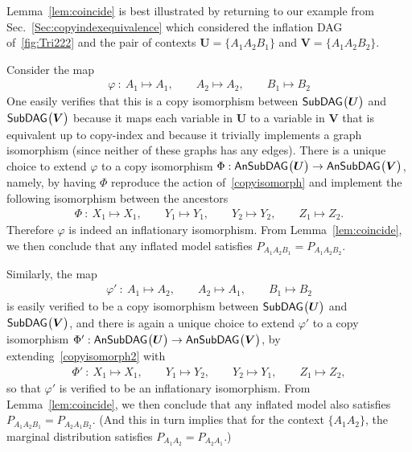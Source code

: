 {Lemma~\ref{lem:coincide} is best illustrated by returning to our example from Sec.~\ref{Sec:copyindexequivalence} 
which considered the inflation DAG of~\cref{fig:Tri222} and the pair of contexts $\bm{U} = \{ A_1 A_2 B_1\}$ and $\bm{V} =\{ A_1 A_2 B_2\}$.  

Consider the map 
\begin{align}\label{copyisomorph}
	\varphi \: : \: A_1 \mapsto A_1,\qquad A_2\mapsto A_2,\qquad B_1\mapsto B_2
\end{align}
One easily verifies that this is a copy isomorphism between ${\operatorname{\mathsf{SubDAG}}_{}}\bigl\lparen\bm{U}\bigr\rparen$ and ${\operatorname{\mathsf{SubDAG}}_{}}\bigl\lparen\bm{V}\bigr\rparen$
because it maps each variable in $\bm{U}$ to a variable in $\bm{V}$ that is equivalent up to copy-index  and because it trivially implements a graph isomorphism (since neither of these graphs has any edges). There is a unique choice to extend $\varphi$ to a copy isomorphism $\Phi:{\operatorname{\mathsf{AnSubDAG}}_{}}\bigl\lparen\bm{U}\bigr\rparen\to{\operatorname{\mathsf{AnSubDAG}}_{}}\bigl\lparen\bm{V}\bigr\rparen$, namely, by having $\Phi$ reproduce the action of~\cref{copyisomorph} and implement the following isomorphism between the ancestors
\begin{align}
\Phi \: : \: X_1\mapsto X_1,\qquad Y_1\mapsto Y_1, \qquad Y_2 \mapsto Y_2, \qquad Z_1 \mapsto Z_2.
\end{align}
Therefore $\varphi$ is indeed an inflationary isomorphism. From Lemma~\ref{lem:coincide}, we then conclude that any inflated model satisfies $P_{A_1 A_2 B_1} = P_{A_1 A_2 B_2}$.

Similarly, the map 
\begin{align}\label{copyisomorph2}
	\varphi' \: : \: A_1 \mapsto A_2,\qquad A_2\mapsto A_1,\qquad B_1\mapsto B_2
\end{align}
is easily verified to be a copy isomorphism between ${\operatorname{\mathsf{SubDAG}}_{}}\bigl\lparen\bm{U}\bigr\rparen$ and ${\operatorname{\mathsf{SubDAG}}_{}}\bigl\lparen\bm{V}\bigr\rparen$, and there is again a unique choice to extend $\varphi'$ to a copy isomorphism $\Phi':{\operatorname{\mathsf{AnSubDAG}}_{}}\bigl\lparen\bm{U}\bigr\rparen\to{\operatorname{\mathsf{AnSubDAG}}_{}}\bigl\lparen\bm{V}\bigr\rparen$, by extending~\cref{copyisomorph2} with
\begin{align}
\Phi' \: : \: X_1\mapsto X_1,\qquad Y_1\mapsto Y_2, \qquad Y_2 \mapsto Y_1, \qquad Z_1 \mapsto Z_2,
\end{align}
so that $\varphi'$ is verified to be an inflationary isomorphism. From Lemma~\ref{lem:coincide}, we then conclude that any inflated model also satisfies $P_{A_1 A_2 B_1} = P_{A_2 A_1 B_2}$.  (And this in turn implies that for the context $\{A_1 A_2\}$, the marginal distribution satisfies $P_{A_1 A_2} = P_{A_2 A_1}$.)


}
